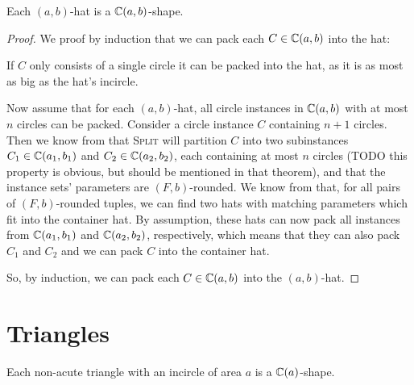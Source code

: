 \documentclass[%
    a4paper,              %
    style=screen,          %
    bibliography=totoc,   %
    nexus,                %
    lnum,                 %
    extramargin,          %
]{tubsbook}
\begin{document}
\begin{theorem}\label{th:hats}
    Each $(a,b)$-hat is a $\mathbb{C}(a,b)$-shape.
\end{theorem}

\begin{proof}

    We proof by induction that we can pack each $C \in \mathbb{C}(a,b)$ into the hat:

    If $C$ only consists of a single circle it can be packed into the hat, as it is as most as big as the hat's incircle.

    Now assume that for each $(a,b)$-hat, all circle instances in $\mathbb{C}(a,b)$ with at most $n$ circles can be packed. Consider a circle instance $C$ containing $n+1$ circles. Then we know from  that \textsc{Split} will partition $C$ into two subinstances $C_1 \in \mathbb{C}(a_1, b_1)$ and $C_2 \in \mathbb{C}(a_2, b_2)$, each containing at most $n$ circles (TODO this property is obvious, but should be mentioned in that theorem), and that the instance sets' parameters are $(F,b)$-rounded. We know from  that, for all pairs of $(F,b)$-rounded tuples, we can find two hats with matching parameters which fit into the container hat. By assumption, these hats can now pack all instances from $\mathbb{C}(a_1, b_1)$ and $\mathbb{C}(a_2, b_2)$, respectively, which means that they can also pack $C_1$ and $C_2$ and we can pack $C$ into the container hat.

    So, by induction, we can pack each $C \in \mathbb{C}(a,b)$ into the $(a,b)$-hat.
\end{proof}

\section{Triangles}

%

\begin{theorem}
    Each non-acute triangle with an incircle of area $a$ is a $\mathbb{C}(a)$-shape.
\end{theorem}
\end{document}
